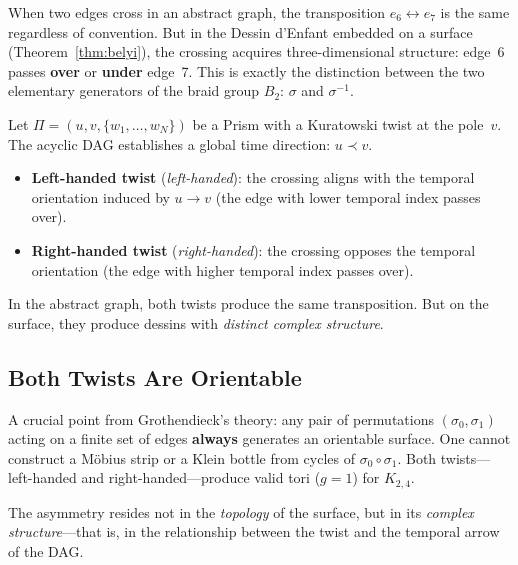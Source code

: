 When two edges cross in an abstract graph, the transposition
$e_6 \leftrightarrow e_7$ is the same regardless of
convention. But in the Dessin d'Enfant embedded on a surface
(Theorem~\ref{thm:belyi}), the crossing acquires three-dimensional
structure: edge~6 passes \textbf{over} or
\textbf{under} edge~7. This is exactly the distinction
between the two elementary generators of the braid group $B_2$:
$\sigma$ and $\sigma^{-1}$.

\begin{definition}
\label{def:twist-chirality}
Let $\Pi = (u, v, \{w_1, \ldots, w_N\})$ be a Prism with a Kuratowski
twist at the pole~$v$. The acyclic DAG establishes a global
time direction: $u \prec v$.
\begin{itemize}
  \item \textbf{Left-handed twist} (\emph{left-handed}): the crossing
    aligns with the temporal orientation induced by $u \to v$
    (the edge with lower temporal index passes over).
  \item \textbf{Right-handed twist} (\emph{right-handed}): the crossing
    opposes the temporal orientation (the edge with higher temporal
    index passes over).
\end{itemize}
\end{definition}

In the abstract graph, both twists produce the same transposition.
But on the surface, they produce dessins with \emph{distinct complex
structure}.

\subsection{Both Twists Are Orientable}

A crucial point from Grothendieck's theory: any pair of
permutations $(\sigma_0, \sigma_1)$ acting on a finite
set of edges \textbf{always} generates an orientable surface.
One cannot construct a M\"obius strip or a Klein bottle from
cycles of $\sigma_0 \circ \sigma_1$. Both twists---left-handed
and right-handed---produce valid tori ($g = 1$) for $K_{2,4}$.

The asymmetry resides not in the \emph{topology} of the surface,
but in its \emph{complex structure}---that is, in the relationship
between the twist and the temporal arrow of the DAG.


